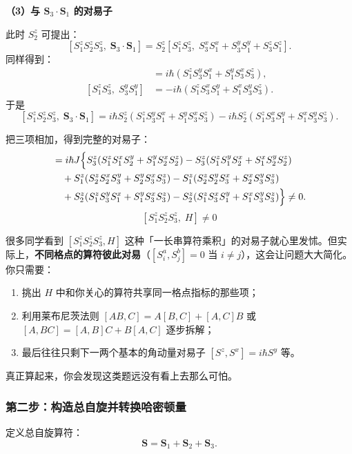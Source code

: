 \textbf{（3）与 $\bm{S}_3\cdot\bm{S}_1$ 的对易子}

此时 $S_2^z$ 可提出：
\[
[S_1^z S_2^z S_3^z,\; \bm{S}_3\cdot\bm{S}_1] = S_2^z [S_1^z S_3^z,\; S_3^x S_1^x + S_3^y S_1^y + S_3^z S_1^z].
\]
同样得到：
\begin{align*}
[S_1^z S_3^z,\; S_3^x S_1^x] &= i\hbar (S_1^z S_3^y S_1^x + S_1^y S_3^x S_3^z), \\
[S_1^z S_3^z,\; S_3^y S_1^y] &= -i\hbar (S_1^z S_3^x S_1^y + S_1^x S_3^y S_3^z).
\end{align*}
于是
\[
[S_1^z S_2^z S_3^z,\; \bm{S}_3\cdot\bm{S}_1] = i\hbar S_2^z (S_1^z S_3^y S_1^x + S_1^y S_3^x S_3^z) - i\hbar S_2^z (S_1^z S_3^x S_1^y + S_1^x S_3^y S_3^z).
\]

把三项相加，得到完整的对易子：
\begin{align*}
[S_1^z S_2^z S_3^z, H]
&= i\hbar J\Bigl\{ S_3^z(S_1^z S_1^x S_2^y + S_1^y S_2^x S_2^z) - S_3^z(S_1^z S_1^y S_2^x + S_1^x S_2^y S_2^z) \\
&\quad + S_1^z(S_2^z S_2^x S_3^y + S_2^y S_3^x S_3^z) - S_1^z(S_2^z S_2^y S_3^x + S_2^x S_3^y S_3^z) \\
&\quad + S_2^z(S_1^z S_3^y S_1^x + S_1^y S_3^x S_3^z) - S_2^z(S_1^z S_3^x S_1^y + S_1^x S_3^y S_3^z) \Bigr\} \neq 0.
\end{align*}
\[
\boxed{[S_1^z S_2^z S_3^z,\; H] \neq 0}
\]

\begin{tipbox}[消除多算符对易子的恐惧]
很多同学看到 $[S_1^z S_2^z S_3^z, H]$ 这种「一长串算符乘积」的对易子就心里发怵。但实际上，\textbf{不同格点的算符彼此对易}（$[S_i^a, S_j^b] = 0$ 当 $i \neq j$），这会让问题大大简化。你只需要：
\begin{enumerate}[nosep]
    \item 挑出 $H$ 中和你关心的算符共享同一格点指标的那些项；
    \item 利用莱布尼茨法则 $[AB, C] = A[B,C] + [A,C]B$ 或 $[A, BC] = [A,B]C + B[A,C]$ 逐步拆解；
    \item 最后往往只剩下一两个基本的角动量对易子 $[S^z, S^x] = i\hbar S^y$ 等。
\end{enumerate}
真正算起来，你会发现这类题远没有看上去那么可怕。
\end{tipbox}

\subsubsection{第二步：构造总自旋并转换哈密顿量}

定义总自旋算符：
\[
\bm{S} = \bm{S}_1 + \bm{S}_2 + \bm{S}_3.
\]

